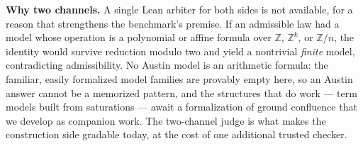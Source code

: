 \textbf{Why two channels.} A single Lean arbiter for both sides is not
available, for a reason that strengthens the benchmark's premise. If an
admissible law had a model whose operation is a polynomial or affine formula
over $\mathbb{Z}$, $\mathbb{Z}^k$, or $\mathbb{Z}/n$, the identity would
survive reduction modulo two and yield a nontrivial \emph{finite} model,
contradicting admissibility. No Austin model is an arithmetic formula: the
familiar, easily formalized model families are provably empty here, so an
Austin answer cannot be a memorized pattern, and the structures that do work —
term models built from saturations — await a formalization of ground
confluence that we develop as companion work. The two-channel judge is what
makes the construction side gradable today, at the cost of one additional
trusted checker.

%
%
%
